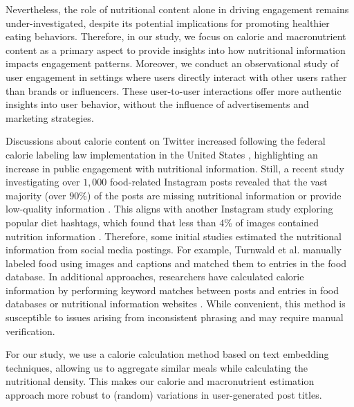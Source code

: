 Nevertheless, the role of nutritional content alone in driving engagement remains under-investigated, despite its potential implications for promoting healthier eating behaviors. Therefore, in our study, we focus on calorie and macronutrient content as a primary aspect to provide insights into how nutritional information impacts engagement patterns.
Moreover, we conduct an observational study of user engagement in settings where users directly interact with other users rather than brands or influencers.
These user-to-user interactions offer more authentic insights into user behavior, without the influence of advertisements and marketing strategies.


Discussions about calorie content on Twitter increased following the federal calorie labeling law implementation in the United States \cite{hswen_federal_2021}, highlighting an increase in public engagement with nutritional information.
Still, 
a recent study investigating over $1,000$ food-related Instagram posts revealed that the vast majority (over $90$\%) of the posts are missing nutritional information or provide low-quality information \cite{kabata_can_2022}.
This aligns with another Instagram study exploring popular diet hashtags, which found that less than $4$\% of images contained nutrition information \cite{lister_what_2024}. 
Therefore, some initial studies estimated the nutritional information from social media postings. For example, Turnwald et al. \cite{turnwald_nutritional_2022} manually labeled food using images and captions and matched them to entries in the food database.
In additional approaches, researchers have calculated calorie information by performing keyword matches between posts and entries in food databases or nutritional information websites \cite{sharma_measuring_2015, abbar_you_2015}. 
While convenient, this method is susceptible to issues arising from inconsistent phrasing and may require manual verification.

For our study, we use a calorie calculation method based on text embedding techniques, allowing us to aggregate similar meals while calculating the nutritional density. 
This makes our calorie and macronutrient estimation approach more robust to (random) variations in user-generated post titles.
